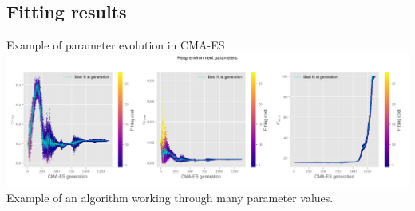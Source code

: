 \documentclass[mathserif,11pt]{beamer}
\begin{document}
\subsection{Fitting results}
\begin{frame}{Example of parameter evolution in CMA-ES}
	\centering
	\includegraphics[width=\textwidth]{Figures/heap_parameter_evolution.png}\\
	\small Example of an algorithm working through many parameter values.
\end{frame}
\end{document}

